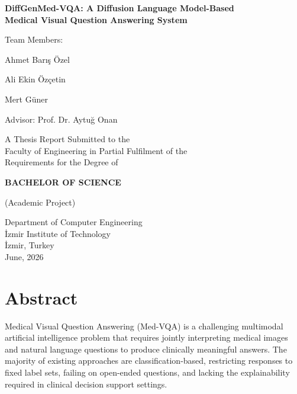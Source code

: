 \documentclass[9pt]{report}
\begin{document}
\begin{titlepage}
    \centering
    \vspace*{2cm}

    {\Huge \sffamily \textbf{DiffGenMed-VQA: A Diffusion Language Model-Based \\ Medical Visual Question Answering System} \par}
    \vspace{2cm}

    {\large
    \sffamily Team Members:\par
    Ahmet Barış Özel  \par
    Ali Ekin Özçetin  \par
    Mert Güner  \par
    }

    \vspace{1cm}
    {\large \sffamily Advisor: Prof. Dr. Aytuğ Onan }

    \vspace{3cm}

    {\large \sffamily
    A Thesis Report Submitted to the \\
    Faculty of Engineering in Partial Fulfilment of the \\
    Requirements for the Degree of
    }

    \vspace{0.5cm}
    {\LARGE \sffamily \textbf{BACHELOR OF SCIENCE}}

    \vspace{0.5cm}
    \sffamily (Academic Project)

    \vspace{1cm}
    \sffamily Department of Computer Engineering \\
    İzmir Institute of Technology \\
    İzmir, Turkey \\
    June, 2026

\end{titlepage}

\chapter*{Abstract}

Medical Visual Question Answering (Med-VQA) is a challenging multimodal artificial intelligence problem that requires jointly interpreting medical images and natural language questions to produce clinically meaningful answers. The majority of existing approaches are classification-based, restricting responses to fixed label sets, failing on open-ended questions, and lacking the explainability required in clinical decision support settings.
\end{document}
